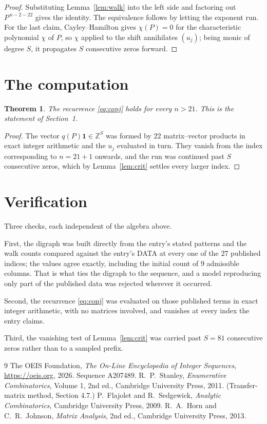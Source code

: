 \documentclass[11pt,a4paper]{article}
\theoremstyle{plain}
\newtheorem{theorem}{Theorem}
\theoremstyle{definition}
\begin{document}
\begin{proof}
Substituting Lemma~\ref{lem:walk} into the left side and factoring out
$P^{\,n-2-22}$ gives the identity. The equivalence follows by letting the exponent
run. For the last claim, Cayley--Hamilton gives $\chi(P)=0$ for the characteristic
polynomial $\chi$ of $P$, so $\chi$ applied to the shift annihilates $(u_j)$; being monic of
degree $S$, it propagates $S$ consecutive zeros forward.
\end{proof}

\section{The computation}

\begin{theorem}
The recurrence \eqref{eq:conj} holds for every $n>21$. This is the statement of
Section~1.
\end{theorem}

\begin{proof}
The vector $q(P)\mathbf{1}\in\mathbb{Z}^{S}$ was formed by $22$ matrix--vector
products in exact integer arithmetic and the $u_j$ evaluated in turn. They vanish from the
index corresponding to $n=21+1$ onwards, and the run was continued past $S$ consecutive
zeros, which by Lemma~\ref{lem:crit} settles every larger index.
\end{proof}

\section{Verification}

Three checks, each independent of the algebra above.

First, the digraph was built directly from the entry's stated patterns and the walk counts
compared against the entry's DATA at every one of the $27$ published indices; the
values agree exactly, including the initial count of $9$ admissible columns. That is
what ties the digraph to the sequence, and a model reproducing only part of the published
data was rejected wherever it occurred.

Second, the recurrence \eqref{eq:conj} was evaluated on those published terms in exact
integer arithmetic, with no matrices involved, and vanishes at every index the entry claims.

Third, the vanishing test of Lemma~\ref{lem:crit} was carried past $S=81$ consecutive
zeros rather than to a sampled prefix.

\begin{thebibliography}{9}
 The OEIS Foundation, \emph{The On-Line Encyclopedia of Integer
Sequences}, \url{https://oeis.org}, 2026. Sequence A207489.
 R.~P.~Stanley, \emph{Enumerative Combinatorics}, Volume 1, 2nd ed.,
Cambridge University Press, 2011. (Transfer-matrix method, Section 4.7.)
 P.~Flajolet and R.~Sedgewick, \emph{Analytic Combinatorics}, Cambridge
University Press, 2009.
 R.~A.~Horn and C.~R.~Johnson, \emph{Matrix Analysis}, 2nd ed., Cambridge
University Press, 2013.
\end{thebibliography}
\end{document}

